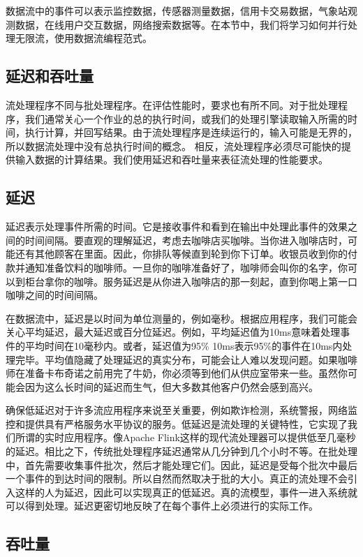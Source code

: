 \documentclass[oneside]{ctexbook}
\begin{document}
数据流中的事件可以表示监控数据，传感器测量数据，信用卡交易数据，气象站观测数据，在线用户交互数据，网络搜索数据等。在本节中，我们将学习如何并行处理无限流，使用数据流编程范式。

\subsection{延迟和吞吐量}

流处理程序不同与批处理程序。在评估性能时，要求也有所不同。对于批处理程序，我们通常关心一个作业的总的执行时间，或我们的处理引擎读取输入所需的时间，执行计算，并回写结果。由于流处理程序是连续运行的，输入可能是无界的，所以数据流处理中没有总执行时间的概念。
相反，流处理程序必须尽可能快的提供输入数据的计算结果。我们使用延迟和吞吐量来表征流处理的性能要求。

\subsection{延迟}

延迟表示处理事件所需的时间。它是接收事件和看到在输出中处理此事件的效果之间的时间间隔。要直观的理解延迟，考虑去咖啡店买咖啡。当你进入咖啡店时，可能还有其他顾客在里面。因此，你排队等候直到轮到你下订单。收银员收到你的付款并通知准备饮料的咖啡师。一旦你的咖啡准备好了，咖啡师会叫你的名字，你可以到柜台拿你的咖啡。服务延迟是从你进入咖啡店的那一刻起，直到你喝上第一口咖啡之间的时间间隔。

在数据流中，延迟是以时间为单位测量的，例如毫秒。根据应用程序，我们可能会关心平均延迟，最大延迟或百分位延迟。例如，平均延迟值为10ms意味着处理事件的平均时间在10毫秒内。或者，延迟值为95\% 10ms表示95\%的事件在10ms内处理完毕。平均值隐藏了处理延迟的真实分布，可能会让人难以发现问题。如果咖啡师在准备卡布奇诺之前用完了牛奶，你必须等到他们从供应室带来一些。虽然你可能会因为这么长时间的延迟而生气，但大多数其他客户仍然会感到高兴。

确保低延迟对于许多流应用程序来说至关重要，例如欺诈检测，系统警报，网络监控和提供具有严格服务水平协议的服务。低延迟是流处理的关键特性，它实现了我们所谓的实时应用程序。像Apache Flink这样的现代流处理器可以提供低至几毫秒的延迟。相比之下，传统批处理程序延迟通常从几分钟到几个小时不等。在批处理中，首先需要收集事件批次，然后才能处理它们。因此，延迟是受每个批次中最后一个事件的到达时间的限制。所以自然而然取决于批的大小。真正的流处理不会引入这样的人为延迟，因此可以实现真正的低延迟。真的流模型，事件一进入系统就可以得到处理。延迟更密切地反映了在每个事件上必须进行的实际工作。

\subsection{吞吐量}
\end{document}
